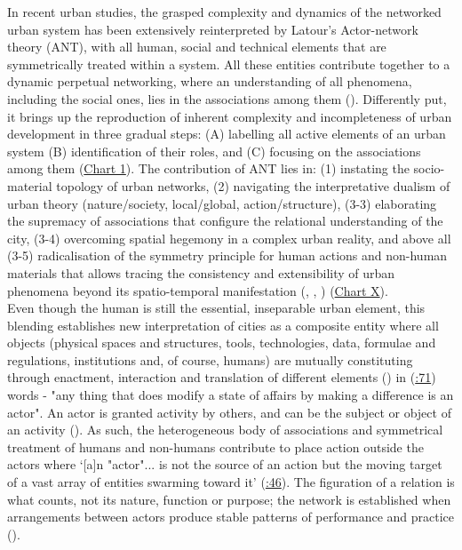 \documentclass[11pt]{report}
\begin{document}
{{{{In recent urban studies, the grasped complexity and dynamics of the networked urban system has been extensively reinterpreted by Latour’s Actor-network theory (ANT), with all human, social and technical elements that are symmetrically treated within a system. All these entities contribute together to a dynamic perpetual networking, where an understanding of all phenomena, including the social ones, lies in the associations among them  (\href{Latour}{\citealt{latour_reassembling_2005}}). Differently put, it brings up the reproduction of inherent complexity and incompleteness of urban development in three gradual steps:  (A) labelling all active elements of an urban system (B) identification of their roles, and (C) focusing on the associations among them (\href{Chart 1}{Chart 1}). The contribution of ANT lies in: (1) instating the socio-material topology of urban networks, (2) navigating the interpretative dualism of urban theory (nature/society, local/global, action/structure), (3-3) elaborating the supremacy of associations that configure the relational understanding of the city, (3-4) overcoming spatial hegemony in a complex urban reality, and above all (3-5) radicalisation of the symmetry principle for human actions and non-human materials that allows tracing the consistency and extensibility of urban phenomena beyond its spatio-temporal manifestation (\href{Latour}{\citealt{latour_we_1993}}, \href{Murdoch}{\citealt{murdoch_spaces_1998}}, \href{Farias}{\citealt{farias_introduction:_2011}}) (\href{Table 1}{Chart X}).
\\

Even though the human is still the essential, inseparable urban element, this blending establishes new interpretation of cities as a composite entity where all objects (physical spaces and structures, tools, technologies, data, formulae and regulations, institutions and, of course, humans) are mutually constituting through enactment, interaction and translation of different elements (\href{Farias}{\citealt{farias_introduction:_2011}}) in  (\href{Latour}{\citealt{latour_reassembling_2005}:71}) words - "any thing that does modify a state of affairs by making a difference is an actor". An actor is granted activity by others, and can be the subject or object of an activity  (\href{Latour}{\citealt{latour_actor-network_1996}}). As such, the heterogeneous body of associations and symmetrical treatment of humans and non-humans contribute to place action outside the actors where ‘[a]n "actor"... is not the source of an action but the moving target of a vast array of entities swarming toward it’ (\href{Latour}{\citealt{latour_reassembling_2005}:46}). The figuration of a relation is what counts, not its nature, function or purpose; the network is established when arrangements between actors produce stable patterns of performance and practice (\href{Smith}{\citealt{smith_world_2003}}).
\\

}}}}
\end{document}

